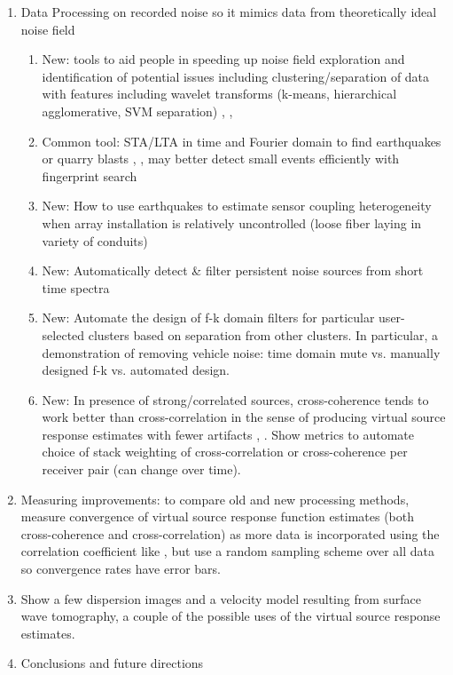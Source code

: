 \documentclass[11pt]{article}
\begin{document}
\begin{enumerate}
	\vspace{-0.4cm}
	\item Data Processing on recorded noise so it mimics data from theoretically ideal noise field \cite{Bensen2007}
		\begin{enumerate}
		\vspace{-0.3cm}
		\item New: tools to aid people in speeding up noise field exploration and identification of potential issues including clustering/separation of data with features including wavelet transforms (k-means, hierarchical agglomerative, SVM separation) \cite{Liao2005}, \cite{Hastie2009}, \cite{Mallat2008} 
		\vspace{-0.1cm}
		\item Common tool: STA/LTA \cite{Withers1998} in time and Fourier domain to find earthquakes or quarry blasts \cite{Bensen2007}, \cite{Girard2016}, may better detect small events efficiently with fingerprint search \cite{Yoon2015}
		\vspace{-0.1cm}
		\item New: How to use earthquakes to estimate sensor coupling heterogeneity when array installation is relatively uncontrolled (loose fiber laying in variety of conduits) 
		\vspace{-0.1cm}
		\item New: Automatically detect \& filter persistent noise sources from short time spectra
		\vspace{-0.1cm}
		\item New: Automate the design of f-k domain filters for particular user-selected clusters based on separation from other clusters. In particular, a demonstration of removing vehicle noise: time domain mute vs. manually designed f-k vs. automated design. 
		\vspace{-0.1cm}
		\item New: In presence of strong/correlated sources, cross-coherence tends to work better than cross-correlation in the sense of producing virtual source response estimates with fewer artifacts \cite{Nakata2011}, \cite{Martin2016}. Show metrics to automate choice of stack weighting of cross-correlation or cross-coherence per receiver pair (can change over time).
		\end{enumerate}
	\vspace{-0.5cm}
	\item Measuring improvements: to compare old and new processing methods, measure convergence of virtual source response function estimates (both cross-coherence and cross-correlation) as more data is incorporated using the correlation coefficient like \cite{Seats2012}, but use a random sampling scheme over all data so convergence rates have error bars.
	\vspace{-0.3cm}
	\item Show a few dispersion images and a velocity model resulting from surface wave tomography, a couple of the possible uses of the virtual source response estimates.
	\vspace{-0.3cm}
	\item Conclusions and future directions
	\end{enumerate}
\end{document}
